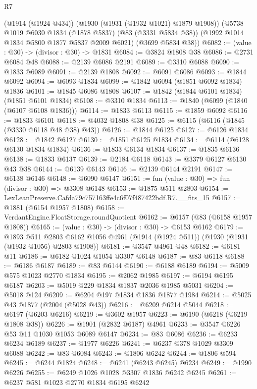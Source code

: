 \begin{lexlean}{R7}
\begin{coremodule}
    (@1914 (@1924 @434))
    (@1930 (@1931 (@1932 @1021) @1879 @1908))
    (@5738
      @1019
      @6030
      @1834
      (@1878 @5837)
      (@83 (@3331 @5834 @38))
      (@1992 @1014 @1834 @5800 @1877 @5837 @2009 @6021)
      (@3699 @5834 @38))
@6082 := (value : @30) -> (divisor : @30) -> @1831
@6084 := @3824 @1808 @38
@6086 := @2731 @6084 @48
@6088 := @2139 @6086 @2191
@6089 := @3310 @6088
@6090 := @1833 @6089
@6091 := @2139 @1808
@6092 := @6091 @6086
@6093 := @1844 @6092
@6094 := @6093 @1834
@6099 := @1842 @6094 (@1851 @6092 @1834) @1836
@6101 := @1845 @6086 @1808
@6107 := @1842 (@1844 @6101 @1834) (@1851 @6101 @1834)
@6108 := @3310 @1834
@6113 := @1840 (@6099 (@1840 (@6107 @6108 @1836)))
@6114 := @1833 @6113
@6115 := @1859 @6092
@6116 := @1833 @6101
@6118 := @4032 @1808 @38
@6125 := @6115 (@6116 (@1845 (@3330 @6118 @48 @38) @43))
@6126 := @1844 @6125
@6127 := @6126 @1834
@6128 := @1842 @6127
@6130 := @1851 @6125 @1834
@6134 := @6114 (@6128 @6130 @1834 @1834)
@6136 := @1833 @6134 @1834
@6137 := @1835 @6136
@6138 := @1833 @6137
@6139 := @2184 @6118
@6143 := @3379 @6127 @6130 @43 @38
@6144 := @6139 @6143
@6146 := @2139 @6144 @2191
@6147 := @6138 @6146
@6148 := @6090 @6147
@6151 := fun (value : @30) => fun (divisor : @30) => @3308 @6148
@6153 := @1875 @511 @2803
@6154 := LexLeanPreserve.Cafda79c757163ffe4c6f07f487422bdf.R7.__fits_15
@6157 := @1881 (@6154 @1957 @1808)
@6158 := VerdantEngine.FloatStorage.roundQuotient
@6162 := @6157 (@83 (@6158 @1957 @1808))
@6165 := (value : @30) -> (divisor : @30) -> @6153 @6162
@6179 := @1893
    @511
    @2803
    @6162
    @1056
    @4961
    (@1914 (@1924 @511))
    (@1930 (@1931 (@1932 @1056) @2803 @1908))
@6181 := @3547 @4961 @48
@6182 := @6181 @11
@6186 := @6182 @1024 @1054 @3307 @6148
@6187 := @83 @6118
@6188 := @6186 @6187
@6189 := @83 @6144
@6190 := @6188 @6189
@6194 := @5009 @575 @1023 @2770 @1834
@6195 := @2062 @1985
@6197 := @6194 @6195 @6187
@6203 := @5019 @229 @1834 @1837 @2036 @1985 @5031
@6204 := @5018 @124
@6209 := @6204 @197 @1834 @1836 @1877 @1984
@6214 := @5025 @43 @1877 (@2004 (@5028 @43))
@6216 := @6209 @6214 @5044
@6218 := @6197 (@6203 @6216)
@6219 := @3602 @1957
@6223 := @6190 (@6218 (@6219 @1808 @38))
@6226 := @1901 (@2832 @6187) @4961
@6233 := @3547 @6226 @53 @11 @1030 @1053 @6089 @6147
@6234 := @83 @6086
@6236 := @6233 @6234 @6189
@6237 := @1977 @6226
@6241 := @6237 @378 @1029 @3309 @6088
@6242 := @83 @6084
@6243 := @1806 @6242
@6244 := @1806 @594
@6245 := @6244 @1824
@6248 := @6241 (@6243 @6245) @6234
@6249 := @1990 @6226
@6255 := @6249 @1026 @1028 @3307 @1836 @6242 @6245
@6261 := @6237 @581 @1023 @2770 @1834 @6195 @6242

\end{coremodule}
\end{lexlean}
